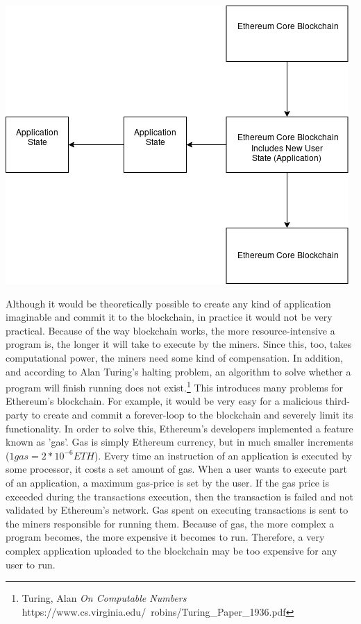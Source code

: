 \documentclass[]{article}
\begin{document}
\bigskip
\begin{minipage}{0.9\linewidth}
\includegraphics[width=\linewidth]{ethereum-state.png}
\end{minipage}%
\hfill
\bigskip

Although it would be theoretically possible to create any kind of application imaginable and commit it to the blockchain, in practice it would not be very practical. Because of the way blockchain works, the more resource-intensive a program is, the longer it will take to execute by the miners. Since this, too, takes computational power, the miners need some kind of compensation. In addition, and according to Alan Turing's halting problem, an algorithm to solve whether a program will finish running does not exist.\footnote{Turing, Alan \textit{On Computable Numbers} https://www.cs.virginia.edu/~robins/Turing\_Paper\_1936.pdf} This introduces many problems for Ethereum's blockchain. For example, it would be very easy for a malicious third-party to create and commit a forever-loop to the blockchain and severely limit its functionality. In order to solve this, Ethereum's developers implemented a feature known as 'gas'. Gas is simply Ethereum currency, but in much smaller increments ($1 gas = 2 * 10^{-6}ETH$). Every time an instruction of an application is executed by some processor, it costs a set amount of gas. When a user wants to execute part of an application, a maximum gas-price is set by the user. If the gas price is exceeded during the transactions execution, then the transaction is failed and not validated by Ethereum's network. Gas spent on executing transactions is sent to the miners responsible for running them. Because of gas, the more complex a program becomes, the more expensive it becomes to run. Therefore, a very complex application uploaded to the blockchain may be too expensive for any user to run.
\end{document}
